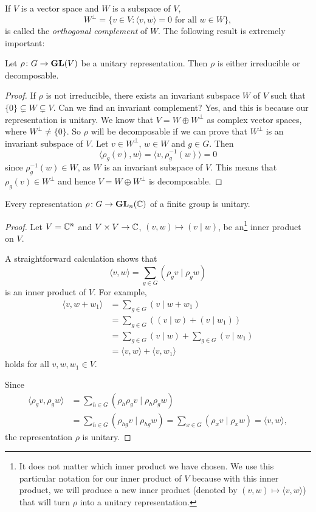 If $V$ is a vector space and $W$ is a subspace of $V$, 
\[
W^\perp = \{v\in V:\langle v,w\rangle=0\text{ for all $w\in W$}\}, 
\]
is called the 
\emph{orthogonal complement} of $W$. The following result is extremely important: 

\begin{proposition}
\label{pro:irr_or_dec}
Let $\rho\colon G\to\mathbf{GL}(V)$ be a unitary representation. Then $\rho$ is either
irreducible or decomposable.
\end{proposition}

\begin{proof}
	If $\rho$ is not irreducible, there exists an invariant subspace $W$ of $V$ such that
	$\{0\}\subsetneq W\subsetneq V$. Can we find an invariant complement? Yes, and this is because 
        our representation is unitary.  
	We know that $V=W\oplus W^{\perp}$ as complex vector spaces, where 
	$W^\perp\ne\{0\}$. So $\rho$ will be decomposable if we can prove that
	$W^\perp$ is an invariant subspace of $V$. 
	Let $v\in W^\perp$, $w\in W$ and $g\in G$. Then  
	\[
	\langle \rho_g(v),w\rangle=\langle v,\rho_g^{-1}(w)\rangle=0   
	\]
	since $\rho_g^{-1}(w)\in W$, as $W$ is an invariant subspace of $V$. This means that 
	$\rho_g(v)\in W^\perp$ and hence $V=W\oplus W^{\perp}$ is decomposable.  
\end{proof}

\begin{theorem}
    Every representation $\rho\colon G\to\mathbf{GL}_n(\mathbb{C})$ 
    of a finite group is unitary.
\end{theorem}

\begin{proof}
    Let $V=\mathbb{C}^n$ and 
    $V\times V\to\mathbb{C}$, $(v,w)\mapsto (v\mid w)$, be an\footnote{It does not matter which inner product we have chosen. 
    We use this particular notation for our inner product of $V$ because  
    with this inner product, we will 
    produce a new inner product (denoted by $(v,w)\mapsto \langle v, w\rangle$) that will turn $\rho$ 
    into a unitary representation.} inner
    product on $V$. 
   
    A straightforward calculation shows that
    \[
    \langle v,w\rangle=\sum_{g\in G}(\rho_gv\mid \rho_gw)
    \]
    is an inner product of $V$. For example, 
    \begin{align*}
    \langle v,w+w_1\rangle&=\sum_{g\in G}(v\mid w+w_1)\\
    &=\sum_{g\in G}\left((v\mid w)+(v\mid w_1)\right)\\
    &=\sum_{g\in G}(v\mid w)+\sum_{g\in G}(v\mid w_1)\\
    &=\langle v,w\rangle+\langle v,w_1\rangle 
    \end{align*}
    holds for all $v,w,w_1\in V$. 
    
    Since
    \begin{align*}
    \langle\rho_gv,\rho_gw\rangle&=\sum_{h\in G}(\rho_h\rho_gv\mid \rho_h\rho_gw)\\
    &=\sum_{h\in G}(\rho_{hg}v\mid\rho_{hg}w)=\sum_{x\in G}(\rho_xv\mid\rho_xw)=\langle v,w\rangle,
    \end{align*}
    the representation $\rho$ is unitary.
\end{proof}

